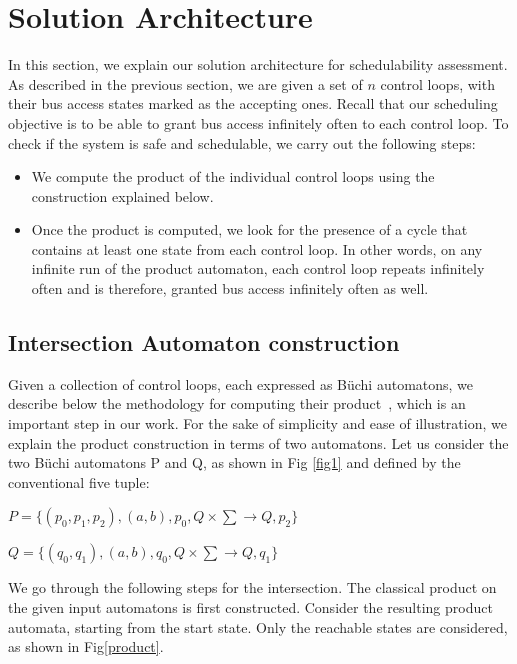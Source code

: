 \section{Solution Architecture} \label{sec4}
\noindent
In this section, we explain our solution architecture for schedulability assessment. As described in the previous section, we are given a set of $n$ control loops, with their bus access states marked as the accepting ones. Recall that our scheduling objective is to be able to grant bus access infinitely often to each control loop. To check if the system is safe and schedulable, we carry out the following steps: 

\begin{itemize}

\item We compute the product of the individual control loops using the construction explained below. 

\item Once the product is computed, we look for the presence of a cycle that contains at least one state from each control loop. In other words, on any infinite run of the product automaton, each control loop repeats infinitely often and is therefore, granted bus access infinitely often as well. 

\end{itemize}


\subsection{Intersection Automaton construction}
\noindent
Given a collection of control loops, each expressed as B\"{u}chi automatons, we describe below the methodology for computing their product~\cite{DBLP:books/ws/automata2012/ChevalierDMP12}, which is an important step in our work. For the sake of simplicity and ease of illustration, we explain the product construction in terms of two automatons. 
Let us consider the two B\"{u}chi automatons P and Q, as shown in Fig \ref{fig1} and defined by the
conventional five tuple:

$P = \{(p_0,p_1,p_2),(a,b),p_0, Q \times \sum \rightarrow Q,p_2\}$

$Q = \{(q_0,q_1),(a,b),q_0, Q \times \sum \rightarrow Q,q_1\}$


\noindent
We go through the 
following steps for the intersection. 
The classical product on the given input automatons is first constructed. Consider the resulting product automata, starting from the start state. Only the reachable states are considered, as shown in Fig\ref{product}.

